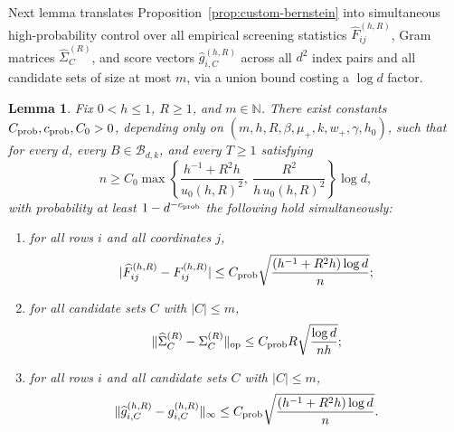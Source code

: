 \documentclass{article}
\newtheorem{lemma}{Lemma}[section]
\newcommand{\norm}[1]{\lVert #1\rVert}
\newcommand{\abs}[1]{\lvert #1\rvert}
\newcommand{\op}{\mathrm{op}}
\begin{document}
Next lemma translates Proposition~\ref{prop:custom-bernstein} into simultaneous high-probability control over all empirical screening statistics $\widehat{F}_{ij}^{(h,R)}$, Gram matrices $\widehat{\Sigma}_C^{(R)}$, and score vectors $\widehat{g}_{i,C}^{(h,R)}$ across all $d^2$ index pairs and all candidate sets of size at most $m$, via a union bound costing a $\log d$ factor.
\begin{lemma}
\label{lem:block-conc-consequences}
Fix $0<h\le1$, $R\ge 1$, and $m\in\mathbb N$. There exist constants $C_{\rm prob},c_{\rm prob},C_0>0$, depending only on $(m,h,R,\beta,\mu_+,k,w_+,\gamma,h_0)$, such that for every $d$, every $B\in\mathcal B_{d,k}$, and every $T\ge 1$ satisfying
\begin{equation}
\label{eq:n-conc-admissible}
n\ge C_0\max\!\left\{\frac{h^{-1}+R^2 h}{u_0(h,R)^2},\ \frac{R^2}{h\,u_0(h,R)^2}\right\}\log d,
\end{equation}
with probability at least $1-d^{-c_{\rm prob}}$ the following hold simultaneously:
\begin{enumerate}[label=(\roman*),itemsep=0.25em]
\item for all rows $i$ and all coordinates $j$,
\begin{equation}
\label{eq:screen-conc}
\abs{\widehat F_{ij}^{(h,R)}-F_{ij}^{(h,R)}}
\le C_{\rm prob}\sqrt{\frac{(h^{-1}+R^2 h)\log d}{n}};
\end{equation}
\item for all candidate sets $C$ with $|C|\le m$,
\begin{equation}
\label{eq:Gram-conc}
\norm{\widehat\Sigma_C^{(R)}-\Sigma_C^{(R)}}_\op
\le C_{\rm prob}R\sqrt{\frac{\log d}{n h}};
\end{equation}
\item for all rows $i$ and all candidate sets $C$ with $|C|\le m$,
\begin{equation}
\label{eq:g-conc}
\norm{\widehat g_{i,C}^{(h,R)}-g_{i,C}^{(h,R)}}_\infty
\le C_{\rm prob}\sqrt{\frac{(h^{-1}+R^2 h)\log d}{n}}.
\end{equation}
\end{enumerate}
\end{lemma}
\end{document}
